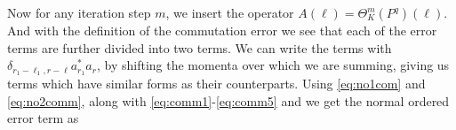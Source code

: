 \documentclass[sn-mathphys, Numbered ,a4paper]{sn-jnl}%
\DeclareMathOperator{\Z}{\mathbb{Z}}
\theoremstyle{plain}
\theoremstyle{definition}
\theoremstyle{remark}
\theoremstyle{plain}
\theoremstyle{definition}
\theoremstyle{remark}
\begin{document}
Now for any iteration step $m$, we insert the operator $A(\ell)= \Theta^m_K(P^q)(\ell)$. And with the definition of the commutation error we see that each of the error terms are further divided into two terms. We can write the terms with $\delta_{r_1-\ell_1,r-\ell}a^*_{r_1}a_{r}$, by shifting the momenta over which we are summing, giving us terms which have similar forms as their counterparts. Using \eqref{eq:no1com} and \eqref{eq:no2comm}, along with \eqref{eq:comm1}-\eqref{eq:comm5} and we get the normal ordered error term as
\begin{comment}
\begin{alignat}{2}
	E_{Q_1}(A) &= -
	\sum\limits_{\ell, \ell_1\in \Z^3_*}\sum\limits_{\substack{r\in L_{\ell} \cap L_{\ell_1}\\ s \in L_{\ell},s_1\in L_{\ell_1}}} A(\ell)_{r,s}K(\ell_1)_{r,s_1}
	\begin{aligned}[t]
		&\Big( 2a^*_{r-\ell_1}b^*_{s}(\ell) b^*_{-s_1}(-\ell_1)a_{r-\ell} \\ &+ b^*_{s}(\ell) a^*_{r-\ell_1}[b_{-s_1}(-\ell_1),a^*_{r-\ell}]^*+ \mathrm{h.c.} \Big)
	\end{aligned}\nonumber\\
	&\quad -\sum\limits_{\ell, \ell_1\in \Z^3_*}\sum\limits_{\substack{r\in (L_{\ell}-\ell) \cap (L_{\ell_1}-\ell_1)\\ s \in L_{\ell},s_1\in L_{\ell_1} }}\!\!\!\!\!\!\!\!\!\begin{aligned}[t] A(\ell)_{r+\ell,s}&K(\ell_1)_{r+\ell_1,s_1}
		\Big( 2a^*_{r+\ell_1}b^*_{s}(\ell) b^*_{-s_1}(-\ell_1) a_{r+\ell}\nonumber \\ &+ b^*_{s}(\ell) a^*_{r+\ell_1}[b_{-s_1}(-\ell_1),a^*_{r+\ell}]^*+ \mathrm{h.c.} \Big)
	\end{aligned}\\
\end{alignat}
\end{comment}
\end{document}
